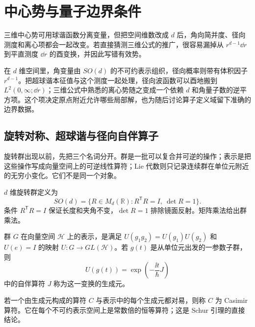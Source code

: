 \chapter{中心势与量子边界条件}
\label{chap:phys-hdqm-higher-dimensional-central-potentials}

三维中心势可用球谐函数分离变量，但把空间维数改成 $d$ 后，角向简并度、径向测度和离心项都会一起改变。若直接猜测三维公式的推广，很容易漏掉从 $r^{d-1}\dd r$ 到平直测度 $\dd r$ 的酉变换，并因此写错有效势。

在 \(d\) 维空间里，角变量由 \(SO(d)\) 的不可约表示组织，径向概率则带有体积因子 \(r^{d-1}\)。把超球谐本征值与这个测度一起处理，径向波函数可以酉地搬到 \(L^2(0,\infty;\dd r)\)；三维公式中熟悉的离心势随之变成一个依赖 \(d\) 和角量子数的逆平方项。这个项决定原点附近允许哪些局部解，也为随后讨论算子定义域留下准确的边界数据。

\section{旋转对称、超球谐与径向自伴算子}
\label{sec:phys-hdqm-general-radial}

旋转群出现以前，先把三个名词分开。群是一批可以复合并可逆的操作；表示是把这些操作写成向量空间上的可逆线性算符；Lie 代数则只记录连续群在单位元附近的无穷小变化。它们不是同一个对象。

\begin{definition}[旋转群 \(SO(d)\)]
\(d\) 维旋转群定义为
\[
SO(d)=\{R\in M_d(\mathbb R):R^{\mathsf T}R=I,\ \det R=1\}.
\]
条件 \(R^{\mathsf T}R=I\) 保证长度和夹角不变，\(\det R=1\) 排除镜面反射。矩阵乘法给出群乘法。
\end{definition}

\begin{definition}[群表示与生成元]
群 \(G\) 在向量空间 \(\mathcal H\) 上的表示，是满足
\(U(g_1g_2)=U(g_1)U(g_2)\) 和 \(U(e)=I\) 的映射
\(U:G\to GL(\mathcal H)\)。若 \(g(t)\) 是从单位元出发的一参数子群，则
\[
U(g(t))=\exp\!\left(-\frac{\ii t}{\hbar}J\right)
\]
中的自伴算符 \(J\) 称为这一变换的生成元。
\end{definition}

\begin{definition}[Casimir 算符]
若一个由生成元构成的算符 \(C\) 与表示中的每个生成元都对易，则称 \(C\) 为 Casimir 算符。它在每个不可约表示空间上是常数倍的恒等算符；这是 Schur 引理的直接结论。
\end{definition}

